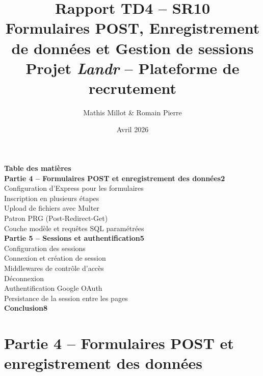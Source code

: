 \documentclass[12pt,a4paper]{article}
\title{\textbf{Rapport TD4 -- SR10}\\
\large Formulaires POST, Enregistrement de données et Gestion de sessions\\[4pt]
\normalsize Projet \textit{Landr} -- Plateforme de recrutement}
\author{Mathis Millot & Romain Pierre}
\date{Avril 2026}
\begin{document}
\maketitle
\thispagestyle{empty}

{\large\bfseries Table des matières}\\[1em]
\noindent\textbf{Partie 4 -- Formulaires POST et enregistrement des données}\dotfill\textbf{2}\\[2pt]
\noindent\hspace{1.5em}Configuration d'Express pour les formulaires\\[2pt]
\noindent\hspace{1.5em}Inscription en plusieurs étapes\\[2pt]
\noindent\hspace{1.5em}Upload de fichiers avec Multer\\[2pt]
\noindent\hspace{1.5em}Patron PRG (Post-Redirect-Get)\\[2pt]
\noindent\hspace{1.5em}Couche modèle et requêtes SQL paramétrées\\[6pt]
\noindent\textbf{Partie 5 -- Sessions et authentification}\dotfill\textbf{5}\\[2pt]
\noindent\hspace{1.5em}Configuration des sessions\\[2pt]
\noindent\hspace{1.5em}Connexion et création de session\\[2pt]
\noindent\hspace{1.5em}Middlewares de contrôle d'accès\\[2pt]
\noindent\hspace{1.5em}Déconnexion\\[2pt]
\noindent\hspace{1.5em}Authentification Google OAuth\\[2pt]
\noindent\hspace{1.5em}Persistance de la session entre les pages\\[6pt]
\noindent\textbf{Conclusion}\dotfill\textbf{8}
\newpage

\section{Partie 4 -- Formulaires POST et enregistrement des données}
\end{document}
